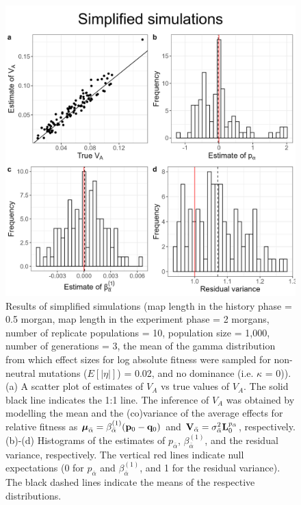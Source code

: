 \documentclass[12pt]{article}
\begin{document}
\begin{bibunit}
\begin{figure}[H]
\includegraphics[scale = 0.15]{Figures/simplified_main.jpg}
\caption{Results of simplified simulations  (map length in the history phase = 0.5 morgan, map length in the experiment phase = 2 morgans, number of replicate populations = 10, population size = 1,000, number of generations = 3, the mean of the gamma distribution from which effect sizes for log absolute fitness were sampled for non-neutral mutations ($E[|\eta|]$) = 0.02, and no dominance (i.e. $\kappa$ = 0)). (a) A scatter plot of estimates of $V_A$ vs true values of $V_A$. The solid black line indicates the 1:1 line. The inference of $V_A$ was obtained by modelling the mean and the (co)variance of the average effects for relative fitness as $\boldsymbol{\mu}_{\bar{\alpha}} = \beta^{(1)}_{\bar{\alpha}}({\bf p}_{0}-{\bf q}_{0})$ and ${\bf V}_{\bar{\alpha}}=\sigma^2_{\bar{\alpha}}{\bf L}_{0}^{p_{\bar{\alpha}}}$, respectively.   (b)-(d) Histograms of the estimates of $p_{\bar \alpha} $, $\beta^{(1)}_{\bar{\alpha}}$, and the residual variance, respectively. The vertical red lines indicate null expectations (0 for $p_{\bar \alpha} $ and $\beta^{(1)}_{\bar{\alpha}}$, and 1 for the residual variance). The black dashed lines indicate the means of the respective distributions.}
  \label{fig:simplified_main}
\end{figure}


\end{bibunit}
\end{document}
